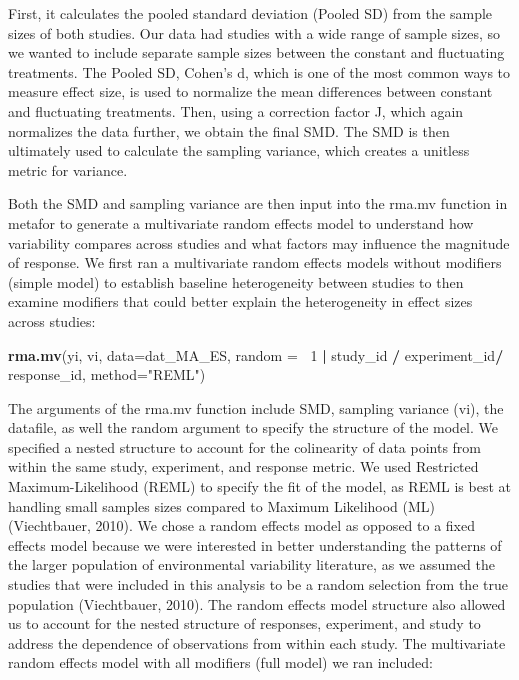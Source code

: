 \documentclass[12pt,twoside]{reedthesis}
\newenvironment{Shaded}{\begin{snugshade}}{\end{snugshade}}
\newcommand{\DataTypeTok}[1]{\textcolor[rgb]{0.13,0.29,0.53}{#1}}
\newcommand{\DecValTok}[1]{\textcolor[rgb]{0.00,0.00,0.81}{#1}}
\newcommand{\KeywordTok}[1]{\textcolor[rgb]{0.13,0.29,0.53}{\textbf{#1}}}
\newcommand{\NormalTok}[1]{#1}
\newcommand{\OperatorTok}[1]{\textcolor[rgb]{0.81,0.36,0.00}{\textbf{#1}}}
\newcommand{\StringTok}[1]{\textcolor[rgb]{0.31,0.60,0.02}{#1}}
\begin{document}
First, it calculates the pooled standard deviation (Pooled SD) from the sample sizes of both studies. Our data had studies with a wide range of sample sizes, so we wanted to include separate sample sizes between the constant and fluctuating treatments. The Pooled SD, Cohen's d, which is one of the most common ways to measure effect size, is used to normalize the mean differences between constant and fluctuating treatments. Then, using a correction factor J, which again normalizes the data further, we obtain the final SMD. The SMD is then ultimately used to calculate the sampling variance, which creates a unitless metric for variance.

Both the SMD and sampling variance are then input into the rma.mv function in metafor to generate a multivariate random effects model to understand how variability compares across studies and what factors may influence the magnitude of response. We first ran a multivariate random effects models without modifiers (simple model) to establish baseline heterogeneity between studies to then examine modifiers that could better explain the heterogeneity in effect sizes across studies:
\begin{Shaded}
\begin{Highlighting}[]
\KeywordTok{rma.mv}\NormalTok{(yi, vi, }
       \DataTypeTok{data=}\NormalTok{dat_MA_ES, }
       \DataTypeTok{random =} \OperatorTok{~}\DecValTok{1} \OperatorTok{|}\StringTok{ }\NormalTok{study_id }\OperatorTok{/}\StringTok{ }\NormalTok{experiment_id}\OperatorTok{/}\StringTok{ }\NormalTok{response_id, }
       \DataTypeTok{method=}\StringTok{"REML"}\NormalTok{) }
\end{Highlighting}
\end{Shaded}
The arguments of the rma.mv function include SMD, sampling variance (vi), the datafile, as well the random argument to specify the structure of the model. We specified a nested structure to account for the colinearity of data points from within the same study, experiment, and response metric. We used Restricted Maximum-Likelihood (REML) to specify the fit of the model, as REML is best at handling small samples sizes compared to Maximum Likelihood (ML) (Viechtbauer, 2010). We chose a random effects model as opposed to a fixed effects model because we were interested in better understanding the patterns of the larger population of environmental variability literature, as we assumed the studies that were included in this analysis to be a random selection from the true population (Viechtbauer, 2010). The random effects model structure also allowed us to account for the nested structure of responses, experiment, and study to address the dependence of observations from within each study. The multivariate random effects model with all modifiers (full model) we ran included:
\end{document}
